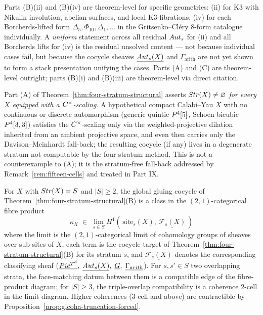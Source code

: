 \begin{remark}
\label{rem:bii-biv-scope}
Parts (B)(ii) and (B)(iv) are theorem-level for specific geometries:
(ii) for K3 with Nikulin involution, abelian surfaces, and local
K3-fibrations; (iv) for each Borcherds-lifted form
$\Delta_5, \Phi_{10}, \Delta_1, \ldots$ in the Gritsenko--Cl\'ery
8-form catalogue individually. A \emph{uniform} statement across
all residual $Aut_s$ for (ii) and all Borcherds lifts for (iv) is
the residual unsolved content --- not because individual cases
fail, but because the cocycle sheaves $\underline{Aut_s(X)}$ and
$\underline{\Gamma_{\mathrm{arith}}}$ are not yet shown to form a
stack presentation unifying the cases. Parts (A) and (C) are
theorem-level outright; parts (B)(i) and (B)(iii) are theorem-level
via direct citation.
\end{remark}

\begin{remark}
\label{rem:part-a-scope}
Part (A) of Theorem~\ref{thm:four-stratum-structural} asserts
$Str(X) \neq \varnothing$ \emph{for every $X$ equipped with a
$C^\times$-scaling}. A hypothetical compact Calabi--Yau $X$ with
no continuous or discrete automorphism (generic quintic $P^4[5]$,
Schoen bicubic $P^4[3, 3]$) satisfies the $C^\times$-scaling
only via the weighted-projective dilation inherited from an
ambient projective space, and even then carries only the
Davison--Meinhardt fall-back; the resulting cocycle (if any) lives
in a degenerate stratum not computable by the four-stratum method.
This is not a counterexample to (A); it is the stratum-free
fall-back addressed by Remark~\ref{rem:fifteen-cells} and treated
in Part IX.
\end{remark}

\begin{proposition}
\label{prop:overlap-coherence}
\ClaimStatusProposition
For $X$ with $Str(X) = S$ and $|S| \geq 2$, the global gluing
cocycle of Theorem~\ref{thm:four-stratum-structural}(B) is a
class in the $(2,1)$-categorical fibre product
\[
  \kappa_X \;\in\;
  \lim_{s \in S} H^1\!\left(\,
    \mathrm{site}_s(X),\,
    \underline{\mathcal{F}_s(X)}\,
  \right)
\]
where the limit is the $(2,1)$-categorical limit of cohomology
groups of sheaves over sub-sites of $X$, each term is the cocycle
target of Theorem~\ref{thm:four-stratum-structural}(B) for its
stratum $s$, and $\underline{\mathcal{F}_s(X)}$ denotes the
corresponding classifying sheaf
($\underline{Pic^{T^d}},\;
  \underline{Aut_s(X)},\;
  \underline{G},\;
  \underline{\Gamma_{arith}}$).
For $s, s' \in S$ two overlapping strata, the face-matching
datum between them is a compatible edge of the fibre-product
diagram; for $|S| \geq 3$, the triple-overlap compatibility is a
coherence 2-cell in the limit diagram. Higher coherences (3-cell
and above) are contractible by
Proposition~\ref{prop:glcoha-truncation-forced}.
\end{proposition}

